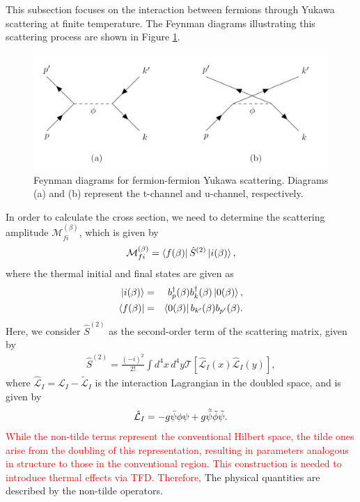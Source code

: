 \documentclass[11pt,showpacs,preprintnumbers,amsmath,amssymb,prd,nofootinbib,superscriptaddress]{revtex4-2}
\begin{document}
This subsection focuses on the interaction between fermions through Yukawa scattering at finite temperature. The Feynman diagrams illustrating this scattering process are shown in Figure \ref{fig1}.
\begin{figure}[!htb]
    \centering
    \includegraphics[scale=0.3]{diagrams.png}
    \caption{Feynman diagrams for fermion-fermion Yukawa scattering. Diagrams (a) and (b) represent the t-channel and u-channel, respectively.}
    \label{fig1}
\end{figure}
In order to calculate the cross section, we need to determine the scattering amplitude $\mathcal{M}_{fi}^{(\beta)}$, which is given by
\begin{eqnarray}
    \mathcal{M}_{fi}^{(\beta)}=\bra{f(\beta)}\hat{S}^{(2)}\ket{i(\beta)},
\end{eqnarray}
where the thermal initial and final states are given as
\begin{eqnarray}
    \ket{i(\beta)} &=& b^{\dagger}_p(\beta) b^{\dagger}_k(\beta) \ket{0(\beta)} ,\\
    \bra{f(\beta)} &=& \bra{0(\beta)} b_{{k}^\prime} (\beta)b_{{p}^\prime}(\beta)  .
\end{eqnarray}
Here, we consider $\hat{S}^{(2)}$ as the second-order term of the scattering matrix, given by
\begin{eqnarray}
    \hat{S}^{(2)}=\frac{(-i)^2}{2!}\int d^4x \, d^4y\mathcal{T}\left[\hat{\mathcal{L}}_I(x)\hat{\mathcal{L}}_I(y)\right],
\end{eqnarray}
where  $\hat{\mathcal{L}}_I=\mathcal{L}_I-\tilde{\mathcal{L}}_I$ is the interaction Lagrangian in the doubled space, and is given by
\begin{eqnarray}
    \hat{\mathcal{L}}_I=-g\Bar{\psi}\phi\psi+g\tilde{\bar{\psi}}\tilde{\phi}\tilde{\psi}.
\end{eqnarray}
\textcolor{red}{While the non-tilde terms represent the conventional Hilbert space, the tilde ones arise from the doubling of this representation, resulting in parameters analogous in structure to those in the conventional region. This construction is needed to introduce thermal effects via TFD. Therefore,} The physical quantities are described by the non-tilde operators.
\end{document}
